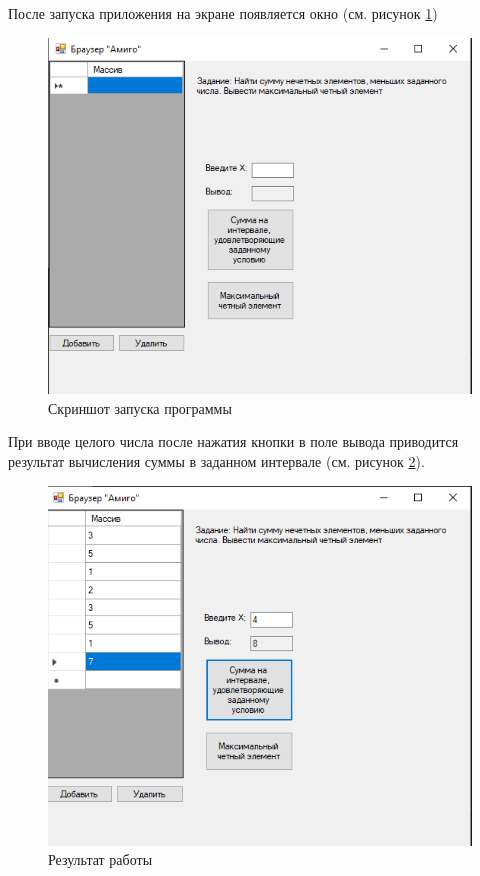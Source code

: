 После запуска приложения на экране появляется окно (см. рисунок \ref{fig:exec4})
\begin{figure}[H]
    \centering
    \includegraphics{task4/exec.png}
    \caption{Скриншот запуска программы}
    \label{fig:exec4}
\end{figure}

При вводе целого числа после нажатия кнопки в поле вывода приводится
результат вычисления суммы в заданном интервале (см. рисунок \ref{fig:result41}).
\begin{figure}[H]
    \centering
    \includegraphics{task4/result1.png}
    \caption{Результат работы}
    \label{fig:result41}
\end{figure}

